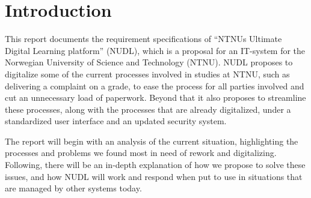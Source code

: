 \section{Introduction}


This report documents the requirement specifications of “NTNUs Ultimate Digital Learning 
platform” (NUDL), which is a proposal for an IT-system for the Norwegian University of 
Science and Technology (NTNU). NUDL proposes to digitalize some of the current processes 
involved in studies at NTNU, such as delivering a complaint on a grade, to ease the 
process for all parties involved and cut an unnecessary load of paperwork. Beyond that 
it also proposes to streamline these processes, along with the processes that are 
already digitalized, under a standardized user interface and an updated security system.

\noindent
The report will begin with an analysis of the current situation, highlighting the 
processes and problems we found most in need of rework and digitalizing. Following, there 
will be an in-depth explanation of how we propose to solve these issues, and how NUDL 
will work and respond when put to use in situations that are managed by other systems 
today.
